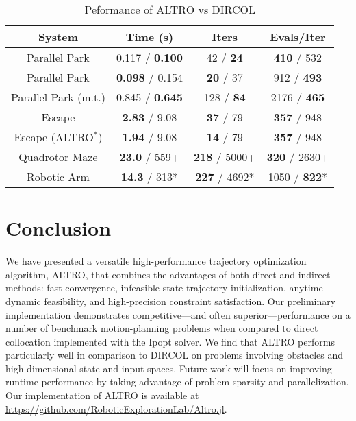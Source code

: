 \documentclass[../root.tex]{subfiles}
\begin{document}
\begin{table}
    \caption{Peformance of ALTRO vs DIRCOL}
    \begin{center}
        \begin{tabular}{|c||c|c|c|}
            \hline
            System & Time (s) & Iters & Evals/Iter \\
            \hline
            \hline
            Parallel Park & 0.117 /\textbf{ 0.100} & 42 / \textbf{24} & \textbf{410} / 532 \\ \hline
            Parallel Park & \textbf{0.098} / 0.154 & \textbf{20} / 37 & 912 / \textbf{493} \\ \hline
            Parallel Park (m.t.) & 0.845 / \textbf{0.645} & 128 / \textbf{84} & 2176 / \textbf{465} \\ \hline
            Escape & \textbf{2.83} / 9.08  & \textbf{37} / 79 & \textbf{357} / 948 \\ \hline
            Escape (ALTRO$^*$) & \textbf{1.94} / 9.08  & \textbf{14} / 79 & \textbf{357} / 948 \\ \hline
            Quadrotor Maze & \textbf{23.0} / 559+ & \textbf{218} / 5000+ & \textbf{320} / 2630+ \\ \hline
            Robotic Arm & \textbf{14.3} / 313* & \textbf{227} / 4692* & 1050 / \textbf{822}* \\ \hline
        \end{tabular}
    \end{center}
    \label{table_performance}
\end{table}

\section{Conclusion}
We have presented a versatile high-performance trajectory optimization
algorithm, ALTRO, that combines the advantages of both direct and indirect
methods: fast convergence, infeasible state trajectory initialization,
anytime dynamic feasibility, and high-precision constraint satisfaction. Our
preliminary implementation demonstrates competitive---and often
superior---performance on a number of benchmark motion-planning problems when
compared to direct collocation implemented with the Ipopt solver. We find
that ALTRO performs particularly well in comparison to DIRCOL on problems
involving obstacles and high-dimensional state and input spaces. Future work
will focus on improving runtime performance by taking advantage of problem
sparsity and parallelization. Our implementation of ALTRO is available at
{\footnotesize
\url{https://github.com/RoboticExplorationLab/Altro.jl}}.
\end{document}
